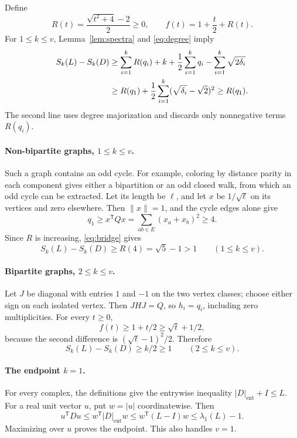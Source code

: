 \documentclass[11pt]{article}
\newcommand{\T}{\mathsf{T}}
\begin{document}
Define
\[
 R(t)=\frac{\sqrt{t^2+4}-2}{2}\geq0,
 \qquad f(t)=1+\frac t2+R(t).
\]
For $1\leq k\leq v$, Lemma~\ref{lem:spectra} and \eqref{eq:degree} imply
\begin{align}
 S_k(L)-S_k(D)
 &\geq\sum_{i=1}^kR(q_i)+k+\frac12\sum_{i=1}^kq_i
                  -\sum_{i=1}^k\sqrt{2\delta_i}\notag\\
 &\geq R(q_1)+\frac12\sum_{i=1}^k
                    (\sqrt{\delta_i}-\sqrt2)^2
 \geq R(q_1).\label{eq:bridge}
\end{align}
The second line uses degree majorization and discards only nonnegative
terms $R(q_i)$.

\paragraph{Non-bipartite graphs, $1\leq k\leq v$.}
Such a graph contains an odd cycle. For example, coloring by distance
parity in each component gives either a bipartition or an odd closed walk,
from which an odd cycle can be extracted. Let its length be $\ell$, and
let $x$ be $1/\sqrt\ell$ on its vertices and zero elsewhere. Then
$\|x\|=1$, and the cycle edges alone give
\[
 q_1\geq x^{\T}Qx
      =\sum_{ab\in E}(x_a+x_b)^2\geq4.
\]
Since $R$ is increasing, \eqref{eq:bridge} gives
\[
 S_k(L)-S_k(D)\geq R(4)=\sqrt5-1>1
 \qquad(1\leq k\leq v).
\]

\paragraph{Bipartite graphs, $2\leq k\leq v$.}
Let $J$ be diagonal with entries $1$ and $-1$ on the two vertex classes;
choose either sign on each isolated vertex. Then $JHJ=Q$, so $h_i=q_i$,
including zero multiplicities. For every $t\geq0$,
\[
 f(t)\geq1+t/2\geq\sqrt t+1/2,
\]
because the second difference is $(\sqrt t-1)^2/2$. Therefore
\[
 S_k(L)-S_k(D)\geq k/2\geq1\qquad(2\leq k\leq v).
\]

\paragraph{The endpoint $k=1$.}
For every complex, the definitions give the entrywise inequality
$|D|_{\mathrm{ent}}+I\leq L$. For a real unit vector $u$, put $w=|u|$
coordinatewise. Then
\[
 u^{\T}Du\leq w^{\T}|D|_{\mathrm{ent}}w
 \leq w^{\T}(L-I)w\leq\lambda_1(L)-1.
\]
Maximizing over $u$ proves the endpoint. This also handles $v=1$.
\end{document}
